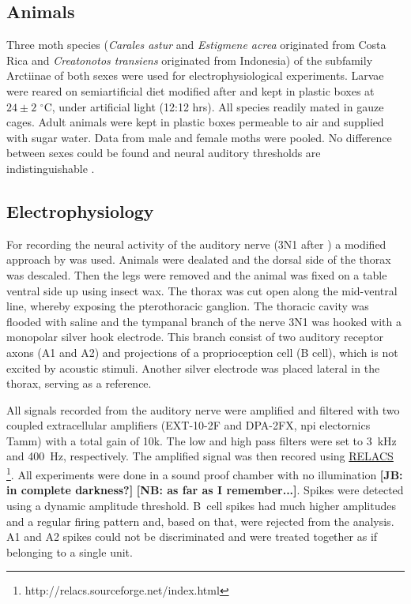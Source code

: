 \documentclass[12pt,a4paper]{article}
\newcommand{\species}[1]{\textit{#1}}
\newcommand{\relacs}[1]{\href{http://www.relacs.net}{#1}}
\newcommand{\note}[2][]{\textbf{[#1: #2]}}
\newcommand{\notejb}[1]{\note[JB]{#1}}
\newcommand{\notenb}[1]{\note[NB]{#1}}
\begin{document}
\subsection{Animals}
Three moth species (\species{Carales astur} and \species{Estigmene acrea} originated from Costa Rica and \species{Creatonotos transiens} originated from Indonesia) of the subfamily Arctiinae of both sexes were used for electrophysiological experiments. Larvae were reared on semiartificial diet modified after \parencite{bergomaz_simple_1986} and kept in plastic boxes at $24\pm2$ $^{\circ}$C, under artificial light (12:12 hrs). All species readily mated in gauze cages. Adult animals were kept in plastic boxes permeable to air and supplied with sugar water. Data from male and female moths were pooled. No difference between sexes could be found and neural auditory thresholds are indistinguishable
\parencite{terhofstede_simple_2013}.        

\subsection{Electrophysiology}
For recording the neural activity of the auditory nerve (3N1 after \parencite{nuesch_morphologie_1957}) a modified approach by \textcite{roeder_ultrasonic_1957} was used. Animals were dealated and the dorsal side of the thorax was descaled. Then the legs were removed and the animal was fixed on a table ventral side up using insect wax. The thorax was cut open along the mid-ventral line, whereby exposing the pterothoracic ganglion. The thoracic cavity was flooded with saline and the tympanal branch of the nerve 3N1 was hooked with a monopolar silver hook electrode. This branch consist of two auditory receptor axons (A1 and A2) and projections of a proprioception cell (B cell), which is not excited by acoustic stimuli. Another silver electrode was placed lateral in the thorax, serving as a reference.   

All signals recorded from the auditory nerve were amplified and filtered with two coupled extracellular amplifiers (EXT-10-2F and DPA-2FX, npi electornics Tamm) with a total gain of 10k. The low and high pass filters were set to 3~kHz and 400~Hz, respectively. The amplified signal was then recored using \relacs{RELACS} \footnote{http://relacs.sourceforge.net/index.html}. All experiments were done in a sound proof chamber with no illumination \notejb{in complete darkness?} \notenb{as far as I remember...}. Spikes were detected using a dynamic amplitude threshold. B~cell spikes had much higher amplitudes and a regular firing pattern and, based on that, were rejected from the analysis. A1 and A2 spikes could not be discriminated and were treated together as if belonging to a single unit. 
\end{document}
